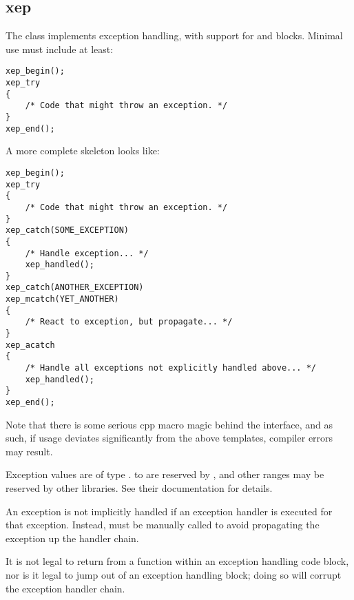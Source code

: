 %
%
%
%
%              

\subsection{xep}
\label{xep}
The  class implements exception handling, with support for
 and  blocks.
Minimal use must include at least:
\begin{verbatim}
xep_begin();
xep_try
{
    /* Code that might throw an exception. */
}
xep_end();
\end{verbatim}

A more complete skeleton looks like:
\begin{verbatim}
xep_begin();
xep_try
{
    /* Code that might throw an exception. */
}
xep_catch(SOME_EXCEPTION)
{
    /* Handle exception... */
    xep_handled();
}
xep_catch(ANOTHER_EXCEPTION)
xep_mcatch(YET_ANOTHER)
{
    /* React to exception, but propagate... */
}
xep_acatch
{
    /* Handle all exceptions not explicitly handled above... */
    xep_handled();
}
xep_end();
\end{verbatim}

Note that there is some serious cpp macro magic behind the 
interface, and as such, if usage deviates significantly from the above
templates, compiler errors may result.

Exception values are of type .   to
 are reserved by , and other ranges may
be reserved by other libraries.  See their documentation for details.

An exception is not implicitly handled if an exception handler is executed for
that exception.  Instead,  must be manually called to
avoid propagating the exception up the handler chain.

It is not legal to return from a function within an exception handling code
block, nor is it legal to jump out of an exception handling block; doing so will
corrupt the exception handler chain.

